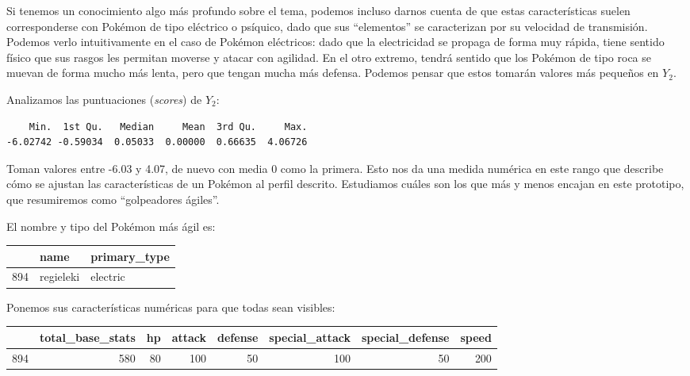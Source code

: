 \documentclass[
  11.8pt,
]{extreport}
\begin{document}
Si tenemos un conocimiento algo más profundo sobre el tema, podemos
incluso darnos cuenta de que estas características suelen corresponderse
con Pokémon de tipo eléctrico o psíquico, dado que sus ``elementos'' se
caracterizan por su velocidad de transmisión. Podemos verlo
intuitivamente en el caso de Pokémon eléctricos: dado que la
electricidad se propaga de forma muy rápida, tiene sentido físico que
sus rasgos les permitan moverse y atacar con agilidad. En el otro
extremo, tendrá sentido que los Pokémon de tipo roca se muevan de forma
mucho más lenta, pero que tengan mucha más defensa. Podemos pensar que
estos tomarán valores más pequeños en \(Y_2\).

Analizamos las puntuaciones (\emph{scores}) de \(Y_2\):

\begin{verbatim}
    Min.  1st Qu.   Median     Mean  3rd Qu.     Max. 
-6.02742 -0.59034  0.05033  0.00000  0.66635  4.06726 
\end{verbatim}

Toman valores entre -6.03 y 4.07, de nuevo con media 0 como la primera.
Esto nos da una medida numérica en este rango que describe cómo se
ajustan las características de un Pokémon al perfil descrito. Estudiamos
cuáles son los que más y menos encajan en este prototipo, que
resumiremos como ``golpeadores ágiles''.

El nombre y tipo del Pokémon más ágil es:

\begin{table}[H]
\centering\begingroup\fontsize{10.5}{12.5}\selectfont

\begin{tabular}{lll}
\toprule
  & name & primary\_type\\
\midrule
894 & regieleki & electric\\
\bottomrule
\end{tabular}
\endgroup{}
\end{table}

Ponemos sus características numéricas para que todas sean visibles:

\begin{table}[H]
\centering\begingroup\fontsize{9.5}{11.5}\selectfont

\begin{tabular}{lrrrrrrr}
\toprule
  & total\_base\_stats & hp & attack & defense & special\_attack & special\_defense & speed\\
\midrule
894 & 580 & 80 & 100 & 50 & 100 & 50 & 200\\
\bottomrule
\end{tabular}
\endgroup{}
\end{table}
\end{document}
